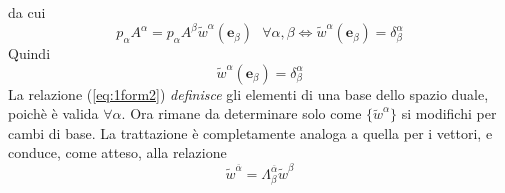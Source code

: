 \documentclass[a4paper,11pt]{book}
\theoremstyle{plain}
\theoremstyle{definition}
\begin{document}
da cui
\[
p_{\alpha}A^{\alpha} = p_{\alpha}A^{\beta}\tilde{w}^{\alpha}(\textbf{e}_{\beta}) \text{ } \forall \alpha,\beta \Longleftrightarrow \tilde{w}^{\alpha}(\textbf{e}_{\beta})=\delta_{\beta}^{\alpha}
\]
Quindi
\begin{equation}\label{eq:1form2}
\tilde{w}^{\alpha}(\textbf{e}_{\beta})=\delta_{\beta}^{\alpha}
\end{equation}
La relazione (\ref{eq:1form2}) \emph{definisce} gli elementi di una base dello spazio duale, poichè è valida $\forall \alpha$. Ora rimane da determinare solo come $\{ \tilde{w}^{\alpha}\}$ si modifichi per cambi di base. La trattazione è completamente analoga a quella per i vettori, e conduce, come atteso, alla relazione
\begin{equation}
\tilde{w}^{\overline{\alpha}}=\Lambda_{\beta}^{\overline{\alpha}}\tilde{w}^{\beta}
\end{equation}
\end{document}
